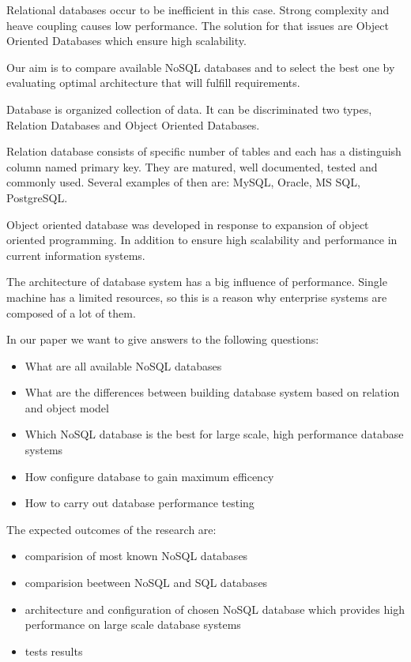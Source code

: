 \documentclass[times, 10pt,twocolumn]{article}
\begin{document}
Relational databases occur to be inefficient in this case. Strong complexity and
heave coupling causes low performance. The solution for that issues are Object Oriented
Databases which ensure high scalability.

Our aim is to compare available NoSQL databases and to select the best one by evaluating 
optimal architecture that will fulfill requirements. 

Database is organized collection of data. It can be discriminated two types, 
Relation Databases and Object Oriented Databases.

Relation database consists of specific number of tables and each has a distinguish column named primary key. 
They are matured, well documented, tested and commonly used. Several examples of then are: MySQL, Oracle, MS SQL, PostgreSQL. 

Object oriented database was developed in response to expansion of object oriented programming. In addition to ensure high scalability and  
performance in current information systems.

The architecture of database system has a big influence of performance. Single machine has a limited
resources, so this is a reason why enterprise systems  are composed of a lot of them.


In our paper we want to give answers to the following questions:

\begin{itemize}
  \item What are all available NoSQL databases
  \item What are the differences between building database system based on relation and object model
  \item Which NoSQL database is the best for large scale, high performance database systems
  \item How configure database to gain maximum efficency
  \item How to carry out database performance testing
\end{itemize}

The expected outcomes of the research are:

\begin{itemize}
  \item comparision of most known NoSQL databases
  \item comparision beetween NoSQL and SQL databases
  \item architecture and configuration of chosen NoSQL database which provides high performance on large scale database systems
  \item tests results
\end{itemize}
 
\end{document}
